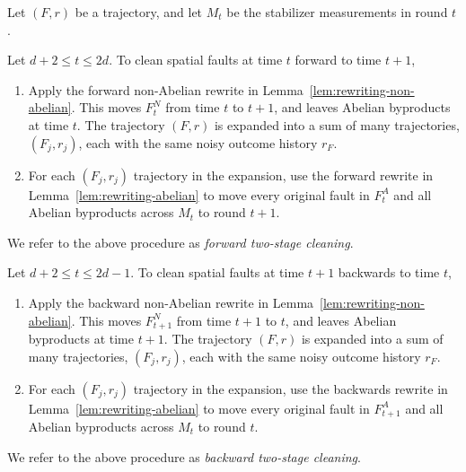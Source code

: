 \documentclass[11pt]{article}
\begin{document}
\begin{definition}
\label{def:two-stage}
    Let $(F,r)$ be a trajectory, and let $M_t$ be the stabilizer measurements in round $t$.

    Let $d+2\le t\le 2d$.
    To clean spatial faults at time $t$ forward to time $t+1$,
    \begin{enumerate}
        \item Apply the forward non-Abelian rewrite in Lemma~\ref{lem:rewriting-non-abelian}. This moves $F_t^N$ from time $t$ to $t+1$, and leaves Abelian byproducts at time $t$. The trajectory $(F,r)$ is expanded into a sum of many trajectories, $(F_j,r_j)$, each with the same noisy outcome history $r_F$.
        \item For each $(F_j,r_j)$ trajectory in the expansion, use the forward rewrite in Lemma~\ref{lem:rewriting-abelian} to move every original fault in $F_t^A$ and all Abelian byproducts across $M_t$ to round $t+1$.
    \end{enumerate}
    We refer to the above procedure as \emph{forward two-stage cleaning}.

    Let $d+2\le t\le 2d-1$.
    To clean spatial faults at time $t+1$ backwards to time $t$,
    \begin{enumerate}
        \item Apply the backward non-Abelian rewrite in Lemma~\ref{lem:rewriting-non-abelian}. This moves $F_{t+1}^N$ from time $t+1$ to $t$, and leaves Abelian byproducts at time $t+1$. The trajectory $(F,r)$ is expanded into a sum of many trajectories, $(F_j,r_j)$, each with the same noisy outcome history $r_F$.
        \item For each $(F_j,r_j)$ trajectory in the expansion, use the backwards rewrite in Lemma~\ref{lem:rewriting-abelian} to move every original fault in $F_{t+1}^A$ and all Abelian byproducts across $M_t$ to round $t$.
    \end{enumerate}
    We refer to the above procedure as \emph{backward two-stage cleaning}.
\end{definition}
\end{document}
